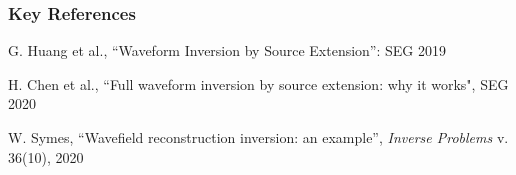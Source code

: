 \documentclass[xcolor=dvipsnames,12pt,aspectratio=169]{beamer}
\begin{document}
\begin{frame}\frametitle{Key References}
G. Huang et al., ``Waveform Inversion by Source Extension'': SEG 2019

H. Chen et al., ``Full waveform inversion by source extension: why it works", SEG 2020

W. Symes, ``Wavefield reconstruction inversion: an example'', {\em Inverse Problems} v. 36(10), 2020
\end{frame}
\end{document}
